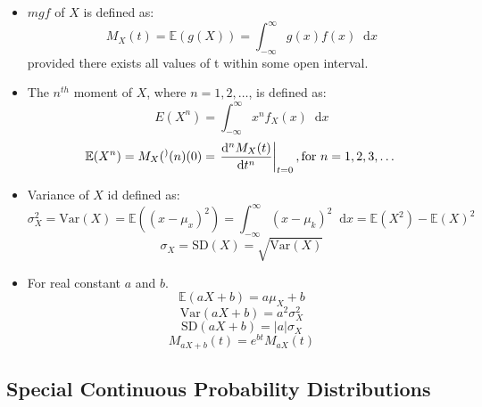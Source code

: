 \documentclass{article}
\newcommand{\abs}[1]{\left| #1 \right|}
\newcommand{\E}{\mathbb{E}}
\newcommand{\mgf}[2]{M_{#1}(#2)}
\newcommand{\Var}{\mathrm{Var}}
\newcommand{\sig}[2]{\sigma_{#1}^{#2}}
\newcommand{\SD}{\mathrm{SD}}
\newcommand{\nder}[3]{\frac{\mathrm{d}^{#1} #2}{\mathrm{d} #3^{#1}}}
\newcommand{\uint}[4]{\int_{#1}^{#2} #3 \dd #4}
\newcommand{\dd}{\mathop{}\!\mathrm{d}}
\newcommand{\evalat}[2]{\left. #1 \right|_{#2}}
\begin{document}
\begin{itemize}
\item $mgf$ of $X$ is defined as:
$$M_X(t) = \E(g(X)) = \uint{-\infty}{\infty}{g(x)f(x)}{x}$$
provided there exists all values of t within some open interval.

\item The $n^{th}$ moment of $X$, where $n = 1, 2, \dotsc$, is defined as:
$$E(X^n) = \uint{-\infty}{\infty}{x^nf_X(x)}{x}$$
$$\E(X^n) = \mgf{X}^{(n)}(0)=\evalat{\nder{n}{\mgf{X}{t}}{t}}{t=0}, \text{for } n = 1, 2, 3, \dotsc$$

\item Variance of $X$ id defined as:
$$\sig{X}{2} = \Var(X) = \E((x-\mu_x)^2) = \uint{-\infty}{\infty}{(x-\mu_k)^2}{x} = \E(X^2) - \E(X)^2$$
$$\sig{X}{} = \SD(X) = \sqrt{\Var(X)}$$

\item For real constant $a$ and $b$.
$$\E(aX+b) = a\mu_X + b$$
$$\Var(aX+b) = a^2\sig{X}{2}$$
$$\SD(aX+b) = \abs{a}\sig{X}{}$$
$$\mgf{aX+b}{t} = e^{bt}\mgf{aX}{t}$$
\end{itemize}



\subsection{Special Continuous Probability Distributions}
\end{document}
